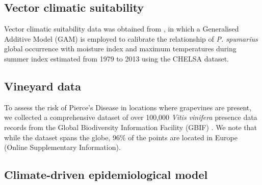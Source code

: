 \subsection{Vector climatic suitability}

Vector climatic suitability data was obtained from \cite{Godefroid2022}, in
which a Generalised Additive Model (GAM) is employed to calibrate the
relationship of \textit{P. spumarius} global occurrence with moisture index and
maximum temperatures during summer index estimated from 1979 to 2013 using the
CHELSA dataset.

\subsection{Vineyard data}

To assess the risk of Pierce's Disease in locations where grapevines are
present, we collected a comprehensive dataset of over 100,000 \textit{Vitis
    vinifera} presence data records from the Global Biodiversity Information
Facility (GBIF) \cite{noauthor_what_nodate,GBIF}. We note that while the
dataset spans the globe, 96\% of the points are located in Europe
(Online Supplementary Information).

\subsection{Climate-driven epidemiological model}

